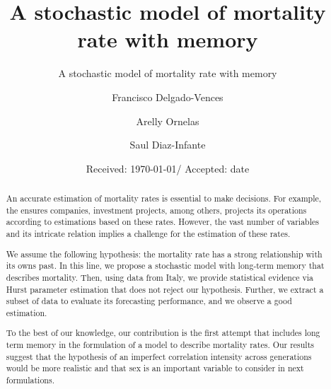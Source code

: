 \documentclass[smallextended]{svjour3}
\begin{document}
%
    \title{A stochastic model of mortality rate with memory}
    \subtitle{A stochastic model of mortality rate with memory}
    \author{Francisco Delgado-Vences 
        \and
        Arelly Ornelas
        \and
        Saul Diaz-Infante
    }
%
    \date{Received: \today / Accepted: date}
    \maketitle
%
\begin{abstract}
        An accurate estimation of mortality rates is essential to make
    decisions. For example, the ensures companies, investment projects, among
    others, projects its operations according to estimations  based on  these
    rates. However, the vast number of variables and its intricate relation
    implies a challenge for the estimation of these rates.

        We assume the following hypothesis: the mortality rate has a strong
    relationship with its owns past. In this line, we propose a stochastic
    model with long-term memory that describes mortality. Then, using data from
    Italy, we provide statistical evidence via Hurst parameter estimation that
    does not reject our hypothesis. Further, we extract a subset of data to
    evaluate its forecasting performance, and we observe a good estimation.

        To the best of our knowledge, our contribution is the first attempt
    that includes long term memory in the formulation of a model to
    describe mortality rates. Our results suggest that the hypothesis of an
    imperfect correlation intensity across generations would be more realistic
    and that sex is an important variable to consider in next formulations.
\end{abstract}
%
%
\end{document}
